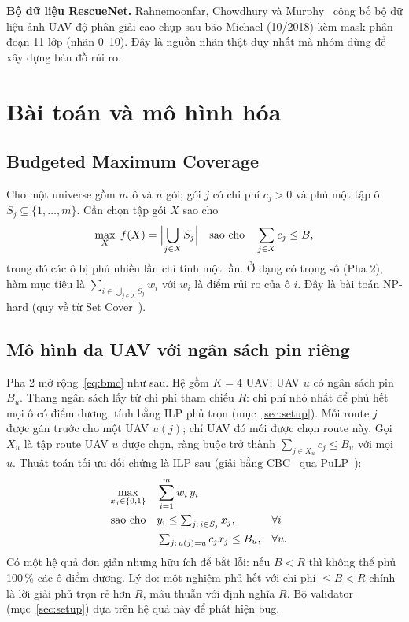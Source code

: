 \documentclass[conference]{IEEEtran}
\begin{document}
\textbf{Bộ dữ liệu RescueNet.} Rahnemoonfar, Chowdhury và Murphy~\cite{rescuenet} công bố bộ
dữ liệu ảnh UAV độ phân giải cao chụp sau bão Michael (10/2018) kèm mask phân đoạn 11 lớp
(nhãn 0--10). Đây là nguồn nhãn thật duy nhất mà nhóm dùng để xây dựng bản đồ rủi ro.

\section{Bài toán và mô hình hóa}
\label{sec:model}

\subsection{Budgeted Maximum Coverage}
Cho một universe gồm $m$ ô và $n$ gói; gói $j$ có chi phí $c_j > 0$ và phủ một tập ô
$S_j \subseteq \{1,\dots,m\}$. Cần chọn tập gói $X$ sao cho
\begin{equation}
\max_{X} \; f(X) = \Bigl| \bigcup_{j \in X} S_j \Bigr|
\quad\text{sao cho}\quad \sum_{j \in X} c_j \le B ,
\label{eq:bmc}
\end{equation}
trong đó các ô bị phủ nhiều lần chỉ tính một lần. Ở dạng có trọng số (Pha 2), hàm mục tiêu
là $ \sum_{i \in \bigcup_{j \in X} S_j} w_i $ với $w_i$ là điểm rủi ro của ô $i$. Đây là bài
toán NP-hard (quy về từ Set Cover~\cite{khuller1999}).

\subsection{Mô hình đa UAV với ngân sách pin riêng}
\label{sec:uavmodel}
Pha 2 mở rộng~\eqref{eq:bmc} như sau. Hệ gồm $K = 4$ UAV; UAV $u$ có ngân sách pin $B_u$.
Thang ngân sách lấy từ chi phí tham chiếu $R$: chi phí nhỏ nhất để phủ hết mọi ô có điểm
dương, tính bằng ILP phủ trọn (mục~\ref{sec:setup}). Mỗi route $j$ được gán trước cho một
UAV $u(j)$; chỉ UAV đó mới được chọn route này. Gọi $X_u$ là tập route UAV $u$ được chọn,
ràng buộc trở thành $\sum_{j \in X_u} c_j \le B_u$ với mọi $u$.
Thuật toán tối ưu đối chứng là ILP sau (giải bằng CBC~\cite{cbc} qua PuLP~\cite{pulp}):
\begin{align}
\max_{x_j \in \{0,1\}} \quad & \sum_{i=1}^{m} w_i \, y_i \notag \\
\text{sao cho} \quad & y_i \le \textstyle\sum_{j:\, i \in S_j} x_j, && \forall i \notag \\
& \textstyle\sum_{j:\, u(j)=u} c_j x_j \le B_u, && \forall u. \label{eq:ilp}
\end{align}
Có một hệ quả đơn giản nhưng hữu ích để bắt lỗi: nếu $B < R$ thì không thể phủ 100\,\% các ô
điểm dương. Lý do: một nghiệm phủ hết với chi phí $\le B < R$ chính là lời giải phủ trọn rẻ
hơn $R$, mâu thuẫn với định nghĩa $R$. Bộ validator (mục~\ref{sec:setup}) dựa trên hệ quả
này để phát hiện bug.
\end{document}
